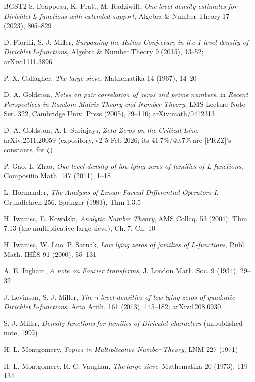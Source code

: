 \documentclass[11pt]{amsart}
\theoremstyle{plain}
\theoremstyle{remark}
\begin{document}
\begin{thebibliography}{BGST2}
 S. Drappeau, K. Pratt, M. Radziwi\l\l, \emph{One-level density
estimates for Dirichlet L-functions with extended support}, Algebra \& Number Theory
17 (2023), 805--829

 D. Fiorilli, S. J. Miller, \emph{Surpassing the Ratios Conjecture in
the 1-level density of Dirichlet L-functions}, Algebra \& Number Theory 9 (2015),
13--52; arXiv:1111.3896

 P. X. Gallagher, \emph{The large sieve}, Mathematika 14 (1967),
14--20

 D. A. Goldston, \emph{Notes on pair correlation of zeros and prime
numbers}, in \emph{Recent Perspectives in Random Matrix Theory and Number Theory},
LMS Lecture Note Ser. 322, Cambridge Univ. Press (2005), 79--110; arXiv:math/0412313

 D. A. Goldston, A. I. Suriajaya, \emph{Zeta Zeros on the
Critical Line}, arXiv:2511.20059 (expository, v2 5 Feb 2026; its 41.7\%/40.7\% are
[PRZZ]'s constants, for $\zeta$)

 P. Gao, L. Zhao, \emph{One level density of low-lying zeros of
families of L-functions}, Compositio Math. 147 (2011), 1--18

 L. H\"ormander, \emph{The Analysis of Linear Partial Differential
Operators I}, Grundlehren 256, Springer (1983), Thm 1.3.5

 H. Iwaniec, E. Kowalski, \emph{Analytic Number Theory}, AMS Colloq.
53 (2004); Thm 7.13 (the multiplicative large sieve), Ch. 7, Ch. 10

 H. Iwaniec, W. Luo, P. Sarnak, \emph{Low lying zeros of families
of L-functions}, Publ. Math. IH\'ES 91 (2000), 55--131

 A. E. Ingham, \emph{A note on Fourier transforms}, J. London
Math. Soc. 9 (1934), 29--32

 J. Levinson, S. J. Miller, \emph{The n-level densities of low-lying
zeros of quadratic Dirichlet L-functions}, Acta Arith. 161 (2013), 145--182;
arXiv:1208.0930

 S. J. Miller, \emph{Density functions for families of Dirichlet
characters} (unpublished note, 1999)

 H. L. Montgomery, \emph{Topics in Multiplicative Number Theory},
LNM 227 (1971)

 H. L. Montgomery, R. C. Vaughan, \emph{The large sieve},
Mathematika 20 (1973), 119--134


\end{thebibliography}
\end{document}
